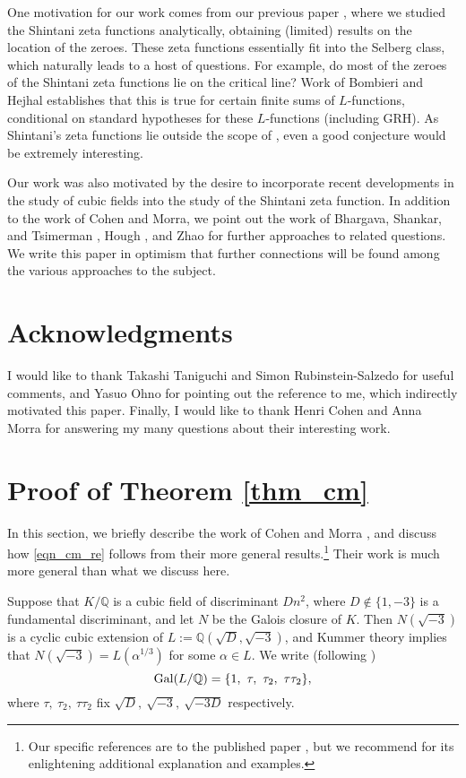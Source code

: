 \documentclass[12pt]{amsart}
\theoremstyle{remark}
\numberwithin{theorem}{section} \numberwithin{equation}{section}
\newcommand{\Q}{\mathbb{Q}}
\newcommand{\Gal}{{\text {\rm Gal}}}
\begin{document}
One motivation for our work comes from our previous paper \cite{T}, where we studied the Shintani zeta functions analytically,
obtaining (limited) results on the location of
the zeroes. These zeta functions essentially fit into the Selberg class, which naturally leads to a host of questions.
For example, do most of the zeroes of the Shintani zeta functions
lie on the critical line? Work of Bombieri and Hejhal \cite{BH} establishes that this is true for certain finite sums of $L$-functions,
conditional on standard hypotheses for these $L$-functions (including GRH).
As Shintani's zeta functions lie outside the scope of \cite{BH},
even a good conjecture would be extremely interesting.

Our work was also motivated by the desire to incorporate recent developments in the study of cubic fields into the study
of the Shintani zeta function. In addition to the work of Cohen and Morra, we point out the work of 
Bhargava, Shankar, and Tsimerman \cite{BST}, Hough \cite{H}, and Zhao \cite{Z} for further approaches to related questions.
We write this paper in optimism that further connections will be found among the various approaches to the subject.

\section{Acknowledgments}
I would like to thank Takashi Taniguchi and Simon Rubinstein-Salzedo for useful comments, and 
Yasuo Ohno
for pointing out the reference \cite{IS} to me, which indirectly motivated this paper.
Finally, I would like to thank Henri Cohen and Anna Morra for answering my many questions about their interesting work.

\section{Proof of Theorem \ref{thm_cm}}\label{sec_cm}
In this section, we briefly describe the work of Cohen and Morra \cite{CM, M}, and discuss how 
\eqref{eqn_cm_re} follows from their more general results.\footnote{Our specific references are to the published paper 
\cite{CM}, but we recommend \cite{M} for its enlightening additional explanation and examples.} 
Their work is much more general than what we discuss here.

Suppose that $K/\Q$ is a cubic field of discriminant $D n^2$, where $D \not \in \{ 1, -3 \}$ is a fundamental discriminant, and 
let $N$ be the Galois closure of $K$. Then $N(\sqrt{-3})$ is a cyclic cubic extension of $L := \Q(\sqrt{D}, \sqrt{-3})$,
and Kummer theory implies that $N(\sqrt{-3}) = L(\alpha^{1/3})$ for some $\alpha \in L$. We write (following \cite[Remark 2.2]{CM})
\begin{equation}
\Gal(L/\Q) = \{1, \ \tau, \ \tau_2, \ \tau \tau_2 \},
\end{equation}
where $\tau, \ \tau_2, \ \tau \tau_2$ fix $\sqrt{D}, \ \sqrt{-3}, \ \sqrt{-3D}$ respectively.
\end{document}
